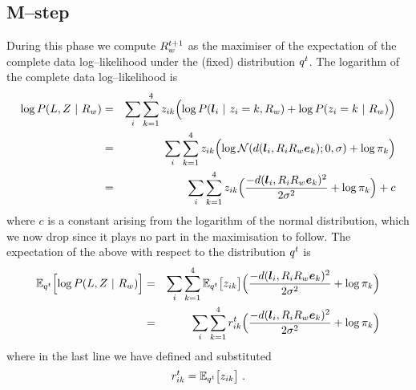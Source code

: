 \subsection{M--step}

During this phase we compute $\SceneR^{t+1}$ as the maximiser of the
expectation of the complete data log--likelihood under the (fixed)
distribution $\PosteriorEst^t$. The logarithm of the complete data
log--likelihood  is
\begin{eqnarray}
  \log P(\LineSegs,\Indicators ~|~ \SceneR) 
  &=&
  \sum_i \sum_{k=1}^4 \Indicator_{ik} \Bigl(
  \log P(\LineSeg_i ~|~ \Indicator_i=k, \SceneR)
  + \log P(\Indicator_i=k ~|~ \SceneR)
  \Bigr)\\
  &=&
  \sum_i \sum_{k=1}^4 \Indicator_{ik} 
  \Bigl(
  \log \NormalDistr(\dist(\LineSeg_i, \CamR_i\SceneR\ebasis_k);0,\sigma)
  + \log \Mixing_k
  \Bigr)\\
  &=&
  \sum_i \sum_{k=1}^4 \Indicator_{ik} 
  \Bigl(
  \frac{-\dist(\LineSeg_i, \CamR_i\SceneR\ebasis_k)^2}{2\sigma^2}
  + \log \Mixing_k
  \Bigr) + c
\end{eqnarray}
where $c$ is a constant arising from the logarithm of the normal
distribution, which we now drop since it plays no part in the
maximisation to follow. The expectation of the above with respect to
the distribution $\PosteriorEst^t$ is
\begin{eqnarray}
  \Expected_{\PosteriorEst^t}\Bigl[
    \log P(\LineSegs,\Indicators ~|~ \SceneR) 
    \Bigr]
  &=&
  \sum_i \sum_{k=1}^4
  \Expected_{\PosteriorEst^t} \bigl[ \Indicator_{ik} \bigr]
  \Bigl(
  \frac{-\dist(\LineSeg_i, \CamR_i\SceneR\ebasis_k)^2}{2\sigma^2}
  + \log \Mixing_k
  \Bigr)\\
  &=&
  \label{eq:expected-lik}
  \sum_i \sum_{k=1}^4
  \Resp_{ik}^t
  \Bigl(
  \frac{-\dist(\LineSeg_i, \CamR_i\SceneR\ebasis_k)^2}{2\sigma^2}
  + \log \Mixing_k
  \Bigr)
\end{eqnarray}
where in the last line we have defined and substituted
\begin{equation}
  \Resp_{ik}^t = 
  \Expected_{\PosteriorEst^t} \bigl[ \Indicator_{ik} \bigr] ~.
\end{equation}

